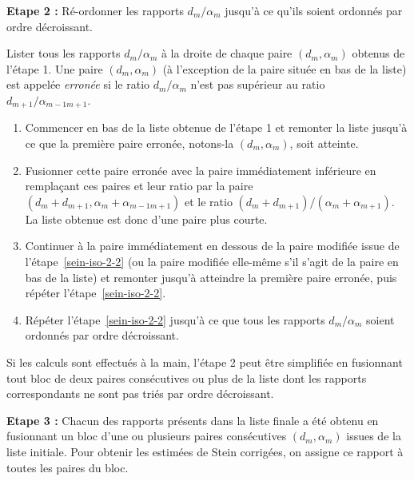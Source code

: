     \bigskip\noindent%
    \textbf{Etape 2 :} Ré-ordonner les rapports $d_m/\alpha_m$ jusqu'à ce qu'ils soient ordonnés par ordre décroissant.
    
    Lister tous les rapports $d_m/\alpha_m$ à la droite de chaque paire $(d_m, \alpha_m)$ obtenus de l'étape 1. Une paire $(d_m, \alpha_m)$ (à l'exception de la paire située en bas de la liste) est appelée \emph{erronée} si le ratio $d_m/\alpha_m$ n'est pas supérieur au ratio $d_{m+1}/\alpha_{m-1m+1}$.
    \begin{enumerate}[label={(\alph*)}]
        \item Commencer en bas de la liste obtenue de l'étape 1 et remonter la liste jusqu'à ce que la première paire erronée, notons-la $(d_m, \alpha_m)$, soit atteinte.
        \item Fusionner cette paire erronée avec la paire immédiatement inférieure en remplaçant ces paires et leur ratio par la paire $(d_m + d_{m+1},\alpha_m + \alpha_{m-1m+1})$ et le ratio $(d_m + d_{m+1})/(\alpha_m + \alpha_{m+1})$. La liste obtenue est donc d'une paire plus courte.\label{sein-iso-2-2}
        \item Continuer à la paire immédiatement en dessous de la paire modifiée issue de l'étape~\ref{sein-iso-2-2} (ou la paire modifiée elle-même s'il s'agit de la paire en bas de la liste) et remonter jusqu'à atteindre la première paire erronée, puis répéter l'étape~\ref{sein-iso-2-2}.\label{sein-iso-2-3}
        \item Répéter l'étape~\ref{sein-iso-2-2} jusqu'à ce que tous les rapports $d_m/\alpha_m$ soient ordonnés par ordre décroissant.
    \end{enumerate}
    Si les calculs sont effectués à la main, l'étape 2 peut être simplifiée en fusionnant tout bloc de deux paires consécutives ou plus de la liste dont les rapports correspondants ne sont pas triés par ordre décroissant.
    
    \bigskip\noindent%
    \textbf{Etape 3 :} Chacun des rapports présents dans la liste finale a été obtenu en fusionnant un bloc d'une ou plusieurs paires consécutives $(d_m,\alpha_m)$ issues de la liste initiale. Pour obtenir les estimées de Stein corrigées, on assigne ce rapport à toutes les paires du bloc.
    

